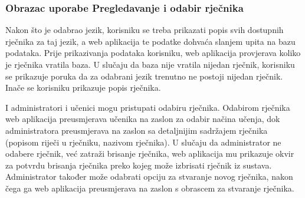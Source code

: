 \subsubsection{{Obrazac uporabe Pregledavanje i odabir rječnika}}

Nakon što je odabrao jezik, korisniku se treba prikazati popis svih dostupnih rječnika za taj jezik, a web aplikacija te podatke dohvaća slanjem upita na bazu podataka. Prije prikazivanja podataka korisniku, web aplikacija provjerava koliko je rječnika vratila baza. U slučaju da baza nije vratila nijedan rječnik, korisniku se prikazuje poruka da za odabrani jezik trenutno ne postoji nijedan rječnik. Inače se korisniku prikazuje popis rječnika.

I administratori i učenici mogu pristupati odabiru rječnika. Odabirom rječnika web aplikacija preusmjerava učenika na zaslon za odabir načina učenja, dok administratora preusmjerava na zaslon sa detaljnijim sadržajem rječnika (popisom riječi u rječniku, nazivom rječnika). U slučaju da administrator ne odabere rječnik, već zatraži brisanje rječnika, web aplikacija mu prikazuje okvir za potvrdu brisanja rječnika preko kojeg može izbrisati rječnik iz sustava. Administrator također može odabrati opciju za stvaranje novog rječnika, nakon čega ga web aplikacija preusmjerava na zaslon s obrascem za stvaranje rječnika.

